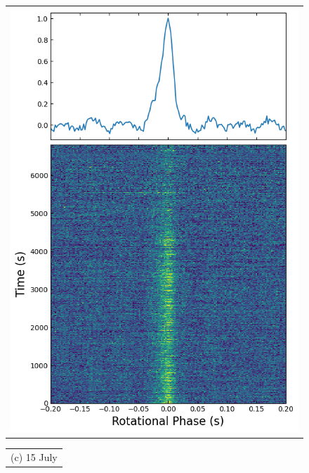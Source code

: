 \documentclass[twocolumn]{emulateapj}
\begin{document}
\begin{figure}[b]
\begin{tabular}[b]{@{}p{}@{}}
	\includegraphics[width=\linewidth]{plots/s-band_Apr08.png}
    \end{tabular}
    \begin{tabular}[b]{@{}p{}@{}}
    \centering\small (c) 15 July

\end{tabular}
\end{figure}
\end{document}
